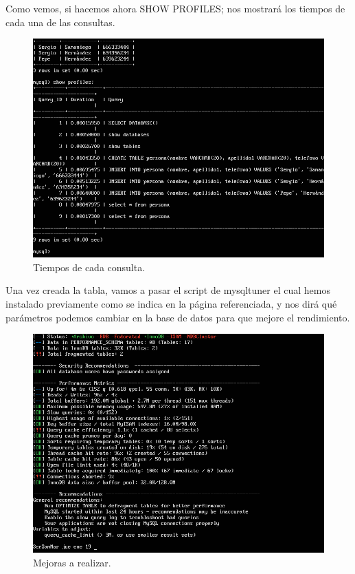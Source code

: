 Como vemos, si hacemos ahora SHOW PROFILES; nos mostrará los tiempos de cada una de las consultas.

\begin{figure}[H] %
	\centering
	\includegraphics[scale=0.5]{imagenes/profiles1.png}  %
	\caption{Tiempos de cada consulta.} \label{fig:figura19}
\end{figure}

Una vez creada la tabla, vamos a pasar el script de mysqltuner el cual hemos instalado previamente como se indica en la página referenciada,\cite{mysql} y nos dirá qué parámetros podemos cambiar en la base de datos para que mejore el rendimiento.

\begin{figure}[H] %
	\centering
	\includegraphics[scale=0.5]{imagenes/mysqltuner.png}  %
	\caption{Mejoras a realizar.} \label{fig:figura20}
\end{figure}

